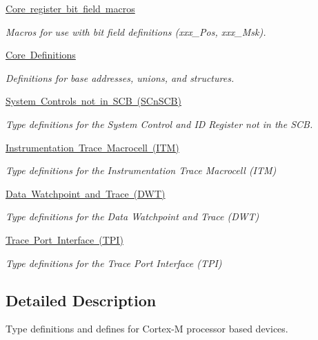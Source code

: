 \begin{DoxyCompactItemize}
\mbox{\hyperlink{group___c_m_s_i_s__core__bitfield}{Core register bit field macros}}
\begin{DoxyCompactList}\small\item\em Macros for use with bit field definitions (xxx\+\_\+\+Pos, xxx\+\_\+\+Msk). \end{DoxyCompactList}\item 
\mbox{\hyperlink{group___c_m_s_i_s__core__base}{Core Definitions}}
\begin{DoxyCompactList}\small\item\em Definitions for base addresses, unions, and structures. \end{DoxyCompactList}\item 
\mbox{\hyperlink{group___c_m_s_i_s___s_cn_s_c_b}{System Controls not in S\+C\+B (\+S\+Cn\+S\+C\+B)}}
\begin{DoxyCompactList}\small\item\em Type definitions for the System Control and ID Register not in the S\+CB. \end{DoxyCompactList}\item 
\mbox{\hyperlink{group___c_m_s_i_s___i_t_m}{Instrumentation Trace Macrocell (\+I\+T\+M)}}
\begin{DoxyCompactList}\small\item\em Type definitions for the Instrumentation Trace Macrocell (I\+TM) \end{DoxyCompactList}\item 
\mbox{\hyperlink{group___c_m_s_i_s___d_w_t}{Data Watchpoint and Trace (\+D\+W\+T)}}
\begin{DoxyCompactList}\small\item\em Type definitions for the Data Watchpoint and Trace (D\+WT) \end{DoxyCompactList}\item 
\mbox{\hyperlink{group___c_m_s_i_s___t_p_i}{Trace Port Interface (\+T\+P\+I)}}
\begin{DoxyCompactList}\small\item\em Type definitions for the Trace Port Interface (T\+PI) \end{DoxyCompactList}\end{DoxyCompactItemize}


\subsection{Detailed Description}
Type definitions and defines for Cortex-\/M processor based devices. 


